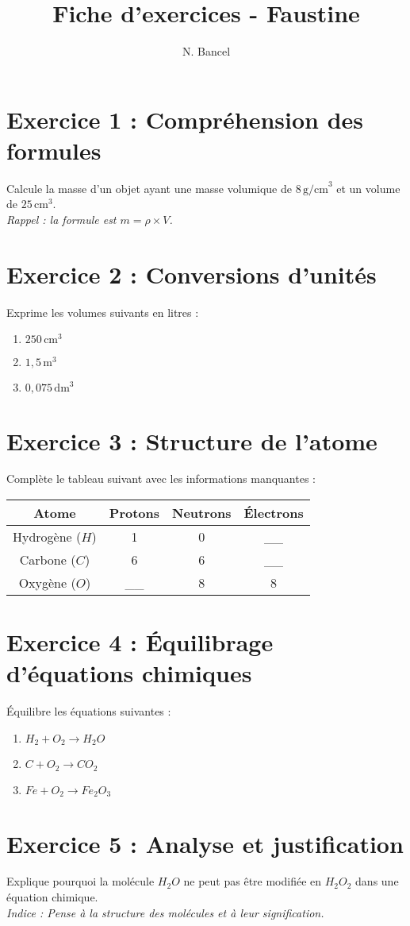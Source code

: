 \documentclass[a4paper,12pt]{article}
\begin{document}
\title{Fiche d'exercices - Faustine}
\author{N. Bancel}
\date{}
\maketitle

\section*{Exercice 1 : Compréhension des formules}
Calcule la masse d'un objet ayant une masse volumique de \( 8 \, \text{g/cm}^3 \) et un volume de \( 25 \, \text{cm}^3 \). \\
\textit{Rappel : la formule est \( m = \rho \times V \).}

\section*{Exercice 2 : Conversions d'unités}
Exprime les volumes suivants en litres :
\begin{enumerate}
    \item \( 250 \, \text{cm}^3 \)
    \item \( 1,5 \, \text{m}^3 \)
    \item \( 0,075 \, \text{dm}^3 \)
\end{enumerate}

\section*{Exercice 3 : Structure de l'atome}
Complète le tableau suivant avec les informations manquantes :

\begin{tabular}{|c|c|c|c|}
\hline
Atome & Protons & Neutrons & Électrons \\
\hline
Hydrogène (\( H \)) & 1 & 0 & \_\_ \\
\hline
Carbone (\( C \)) & 6 & 6 & \_\_ \\
\hline
Oxygène (\( O \)) & \_\_ & 8 & 8 \\
\hline
\end{tabular}

\section*{Exercice 4 : Équilibrage d'équations chimiques}
Équilibre les équations suivantes :
\begin{enumerate}
    \item \( H_2 + O_2 \rightarrow H_2O \)
    \item \( C + O_2 \rightarrow CO_2 \)
    \item \( Fe + O_2 \rightarrow Fe_2O_3 \)
\end{enumerate}

\section*{Exercice 5 : Analyse et justification}
Explique pourquoi la molécule \( H_2O \) ne peut pas être modifiée en \( H_2O_2 \) dans une équation chimique. \\
\textit{Indice : Pense à la structure des molécules et à leur signification.}
\end{document}
